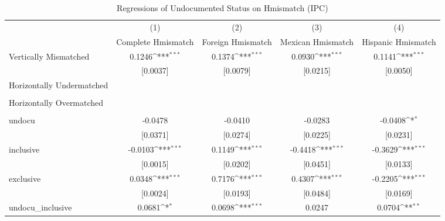 \begin{table}[htbp]\centering
\def\sym#1{\ifmmode^{#1}\else\(^{#1}\)\fi}
\caption{Regressions of Undocumented Status on Hmismatch (IPC)}
\begin{tabular}{l*{4}{c}}
\toprule
                    &\multicolumn{1}{c}{(1)}         &\multicolumn{1}{c}{(2)}         &\multicolumn{1}{c}{(3)}         &\multicolumn{1}{c}{(4)}         \\
                    &Complete Hmismatch         &Foreign Hmismatch         &Mexican Hmismatch         &Hispanic Hmismatch         \\
\midrule
Vertically Mismatched&      0.1246\sym{***}&      0.1374\sym{***}&      0.0930\sym{***}&      0.1141\sym{***}\\
                    &    [0.0037]         &    [0.0079]         &    [0.0215]         &    [0.0050]         \\
\addlinespace
Horizontally Undermatched&                     &                     &                     &                     \\
                    &                     &                     &                     &                     \\
\addlinespace
Horizontally Overmatched&                     &                     &                     &                     \\
                    &                     &                     &                     &                     \\
\addlinespace
undocu              &     -0.0478         &     -0.0410         &     -0.0283         &     -0.0408\sym{*}  \\
                    &    [0.0371]         &    [0.0274]         &    [0.0225]         &    [0.0231]         \\
\addlinespace
inclusive           &     -0.0103\sym{***}&      0.1149\sym{***}&     -0.4418\sym{***}&     -0.3629\sym{***}\\
                    &    [0.0015]         &    [0.0202]         &    [0.0451]         &    [0.0133]         \\
\addlinespace
exclusive           &      0.0348\sym{***}&      0.7176\sym{***}&      0.4307\sym{***}&     -0.2205\sym{***}\\
                    &    [0.0024]         &    [0.0193]         &    [0.0484]         &    [0.0169]         \\
\addlinespace
undocu\_inclusive    &      0.0681\sym{*}  &      0.0698\sym{***}&      0.0247         &      0.0704\sym{**} \\

\end{tabular}
\end{table}
